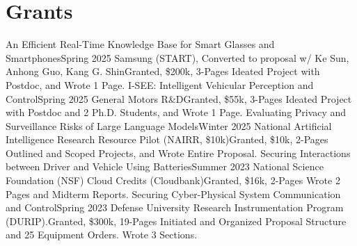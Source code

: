 \section{Grants}
  \CVSubHeadingListStart
    \CVSubheadingLong
      {An Efficient Real-Time Knowledge Base for Smart Glasses and Smartphones}{Spring 2025}
      {Samsung (START), Converted to proposal w/ Ke Sun, Anhong Guo, Kang G. Shin}{Granted, \$200k, 3-Pages}
      {Ideated Project with Postdoc, and Wrote 1 Page.}{}
    \CVSubheadingLong
      {I-SEE: Intelligent Vehicular Perception and Control}{Spring 2025}
      {General Motors R\&D}{Granted, \$55k, 3-Pages}
      {Ideated Project with Postdoc and 2 Ph.D. Students, and Wrote 1 Page.}{}
    \CVSubheadingLong
      {Evaluating Privacy and Surveillance Risks of Large Language Models}{Winter 2025}
      {National Artificial Intelligence Research Resource Pilot (NAIRR, \$10k)}{Granted, \$10k, 2-Pages}
      {Outlined and Scoped Projects, and Wrote Entire Proposal.}{}
    \CVSubheadingLong
      {Securing Interactions between Driver and Vehicle Using Batteries}{Summer 2023}
      {National Science Foundation (NSF) Cloud Credits (Cloudbank)}{Granted, \$16k, 2-Pages}
      {Wrote 2 Pages and Midterm Reports.}{}
    \CVSubheadingLong
      {Securing Cyber-Physical System Communication and Control}{Spring 2023}
      {Defense University Research Instrumentation Program (DURIP).}{Granted, \$300k, 19-Pages}
      {Initiated and Organized Proposal Structure and 25 Equipment Orders. Wrote 3 Sections.}{}
  \CVSubHeadingListEnd